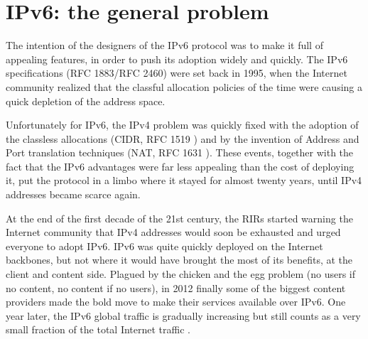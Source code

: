 \section{IPv6: the general problem}

The intention of the designers of the IPv6 protocol was to make it full of appealing features, in order to push its adoption widely and quickly. 
The IPv6 specifications (RFC 1883/RFC 2460) \cite{rfc}
were set back in 1995, when the Internet community realized that the classful allocation policies of the time were causing a quick depletion of the address space. 
\par
Unfortunately for IPv6, the IPv4 problem was quickly fixed with the adoption of the classless allocations (CIDR, RFC 1519 \cite{rfc}) and by the invention of Address and Port translation techniques (NAT, RFC 1631 \cite{rfc}). These events, together with the fact that the IPv6 advantages were far less appealing than the cost of deploying it, put the protocol in a limbo where it stayed for almost twenty years, until IPv4 addresses became scarce again.
\par
At the end of the first decade of the 21st century, the RIRs started warning the Internet community that IPv4 addresses would soon be exhausted and urged everyone to adopt IPv6. IPv6 was quite quickly deployed on the Internet backbones, but not where it would have brought the most of its benefits, at the client and content side. 
Plagued by the chicken and the egg problem (no users if no content, no content if no users), in 2012 finally some of the 
biggest content providers made the bold move to make their services available over IPv6. 
One year later, the IPv6 global traffic is gradually increasing but still counts as a very small fraction of the 
total Internet traffic \cite{ipv6stat}.

